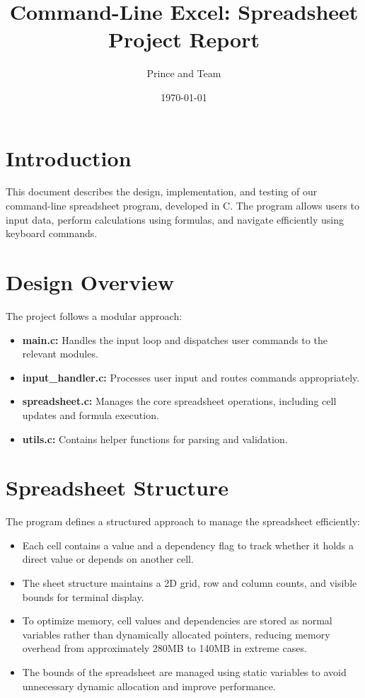 \documentclass{article}
\title{Command-Line Excel: Spreadsheet Project Report}
\author{Prince and Team}
\date{\today}
\begin{document}
\maketitle

\section{Introduction}
This document describes the design, implementation, and testing of our command-line spreadsheet program, developed in C. The program allows users to input data, perform calculations using formulas, and navigate efficiently using keyboard commands.

\section{Design Overview}
The project follows a modular approach:
\begin{itemize}
    \item \textbf{main.c:} Handles the input loop and dispatches user commands to the relevant modules.
    \item \textbf{input\_handler.c:} Processes user input and routes commands appropriately.
    \item \textbf{spreadsheet.c:} Manages the core spreadsheet operations, including cell updates and formula execution.
    \item \textbf{utils.c:} Contains helper functions for parsing and validation.
\end{itemize}

\section{Spreadsheet Structure}
The program defines a structured approach to manage the spreadsheet efficiently:
\begin{itemize}
    \item Each cell contains a value and a dependency flag to track whether it holds a direct value or depends on another cell.
    \item The sheet structure maintains a 2D grid, row and column counts, and visible bounds for terminal display.
    \item To optimize memory, cell values and dependencies are stored as normal variables rather than dynamically allocated pointers, reducing memory overhead from approximately 280MB to 140MB in extreme cases.
    \item The bounds of the spreadsheet are managed using static variables to avoid unnecessary dynamic allocation and improve performance.
\end{itemize}
\end{document}
